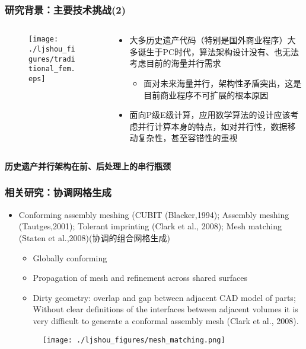 \documentclass[mathserif]{beamer}
\begin{document}
\begin{CJK}{UTF8}{gkai}
	\begin{frame}
	\frametitle{研究背景：主要技术挑战(2)}
	\begin{columns}
		\begin{column}[pos]{0.4\textwidth}
			\begin{figure}
				\texttt{[image: ./ljshou\_figures/traditional\_fem.eps]}
			\end{figure}
		\end{column}
		
		\begin{column}[pos]{0.6\textwidth}
			\begin{itemize}
	  			\item 大多历史遗产代码（特别是国外商业程序）大多诞生于PC时代，算法架构设计没有、也无法考虑目前的海量并行需求
	  		\begin{itemize}
				\item 面对未来海量并行，架构性矛盾突出，这是目前商业程序不可扩展的根本原因
	  		\end{itemize}
	  		\item 面向P级E级计算，应用数学算法的设计应该考虑并行计算本身的特点，如对并行性，数据移动复杂性，甚至容错性的重视
	\end{itemize}
		\end{column}
	\end{columns}
	\begin{block}{}
		\color{red}\bf 历史遗产并行架构在前、后处理上的串行瓶颈
	\end{block}
\end{frame}

	\begin{frame}
	\frametitle{相关研究：协调网格生成}
	\begin{itemize}
	  \small
	  \item Conforming assembly meshing (CUBIT (Blacker,1994); Assembly meshing (Tautges,2001); Tolerant imprinting (Clark et al., 2008); Mesh matching (Staten et al.,2008)(协调的组合网格生成)
		\begin{itemize}
		\scriptsize
		\item Globally conforming
            \item {\color{red}Propagation of mesh and refinement across shared surfaces}
            \item {\color{red}Dirty geometry}: overlap and gap between adjacent CAD model of parts; Without clear definitions of the interfaces between adjacent volumes it is very difficult to generate a conformal assembly mesh (Clark et al., 2008). 
	  	\end{itemize}
	  	\begin{figure}
	  		\texttt{[image: ./ljshou\_figures/mesh\_matching.png]}
	  	\end{figure}
	\end{itemize}
\end{frame}


\end{CJK}
\end{document}
